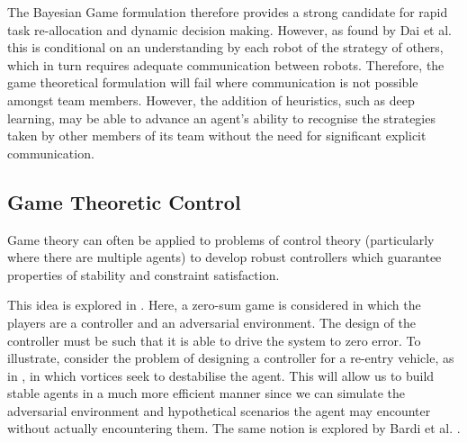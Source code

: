 \documentclass[.../main.tex]{subfiles}
\begin{document}
The Bayesian Game formulation therefore provides a strong candidate for rapid task re-allocation and
dynamic decision making. However, as found by Dai et al. \cite{Dai2018} this is
conditional on an understanding by each robot of the strategy of others, which in turn requires
adequate communication between robots. Therefore, the game theoretical formulation will fail where
communication is not possible amongst team members. However, the addition of heuristics, such as
deep learning, may be able to advance an agent’s ability to recognise the strategies taken by other
members of its team without the need for significant explicit communication.


\subsection{Game Theoretic Control} \label{Game Theoretic Control}

Game theory can often be applied to problems of control theory (particularly where there are
multiple agents) to develop robust controllers which guarantee properties of stability and
constraint satisfaction. 

This idea is explored in \cite{Marden2018AnnualControl}. Here, a zero-sum game is considered in
which the players are a controller and an adversarial environment. The design of the controller must
be such that it is able to drive the system to zero error. To illustrate, consider the problem of
designing a controller for a re-entry vehicle, as in \cite{Breitner1994ReentryGame}, in which
vortices seek to destabilise the agent. This will allow us to build stable agents in a much more
efficient manner since we can simulate the adversarial environment and hypothetical scenarios the
agent may encounter without actually encountering them. The same notion is explored by Bardi et al.
\cite{Bardi1991DifferentialDisturbances}.
\end{document}
